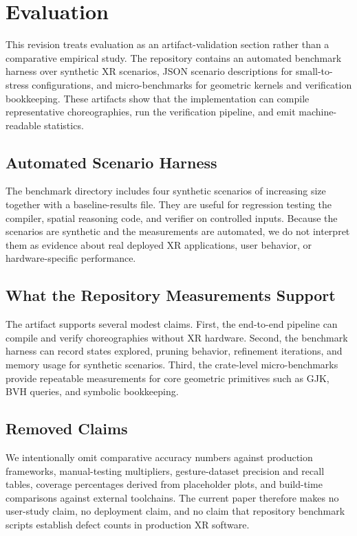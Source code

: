 \documentclass[11pt,a4paper]{article}
\begin{document}
\section{Evaluation}\label{sec:evaluation}

This revision treats evaluation as an artifact-validation section
rather than a comparative empirical study.  The repository contains an
automated benchmark harness over synthetic XR scenarios, JSON scenario
descriptions for small-to-stress configurations, and micro-benchmarks
for geometric kernels and verification bookkeeping.  These artifacts
show that the implementation can compile representative choreographies,
run the verification pipeline, and emit machine-readable statistics.

\subsection{Automated Scenario Harness}

The benchmark directory includes four synthetic scenarios of increasing
size together with a baseline-results file.  They are useful for
regression testing the compiler, spatial reasoning code, and verifier
on controlled inputs.  Because the scenarios are synthetic and the
measurements are automated, we do not interpret them as evidence about
real deployed XR applications, user behavior, or hardware-specific
performance.

\subsection{What the Repository Measurements Support}

The artifact supports several modest claims.  First, the end-to-end
pipeline can compile and verify choreographies without XR hardware.
Second, the benchmark harness can record states explored, pruning
behavior, refinement iterations, and memory usage for synthetic
scenarios.  Third, the crate-level micro-benchmarks provide repeatable
measurements for core geometric primitives such as GJK, BVH queries,
and symbolic bookkeeping.

\subsection{Removed Claims}

We intentionally omit comparative accuracy numbers against production
frameworks, manual-testing multipliers, gesture-dataset precision and
recall tables, coverage percentages derived from placeholder plots, and
build-time comparisons against external toolchains.  The current paper
therefore makes no user-study claim, no deployment claim, and no claim
that repository benchmark scripts establish defect counts in production
XR software.
\end{document}
